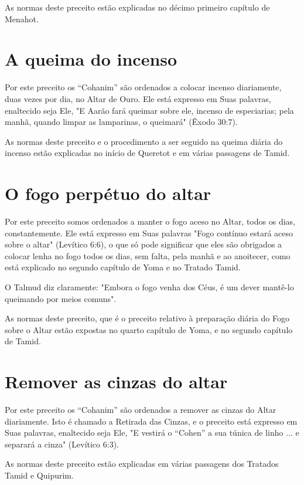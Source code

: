 As normas deste preceito estão explicadas no décimo primeiro capí­tulo
de Menahot.

\section{A queima do incenso}

Por este preceito os ``Cohanim'' são ordenados a colocar incenso
diariamente, duas vezes por dia, no Altar de Ouro. Ele está expresso em
Suas palavras, enaltecido seja Ele, "E Aarão fará queimar sobre ele,
incenso de espe­ciarias; pela manhã, quando limpar as lamparinas, o
queimará" (Êxodo 30:7).

As normas deste preceito e o procedimento a ser seguido na queima diária
do incenso estão explicadas no início de Queretot e em várias passagens
de Tamid.

\section{O fogo perpétuo do altar}

Por este preceito somos ordenados a manter o fogo aceso no Altar, todos
os dias, constantemente. Ele está expresso em Suas palavras "Fogo
con­tínuo estará aceso sobre o altar" (Levítico 6:6), o que só pode
significar que eles são obrigados a colocar lenha no fogo todos os dias,
sem falta, pela manhã e ao anoitecer, como está explicado no segundo
capítulo de Yoma e no Trata­do Tamid.

O Talmud diz claramente: "Embora o fogo venha dos Céus, é um dever
mantê-lo queimando por meios comuns".

As normas deste preceito, que é o preceito relativo à preparação diária
do Fogo sobre o Altar estão expostas no quarto capítulo de Yoma, e no
segun­do capítulo de Tamid.

\section{Remover as cinzas do altar}

Por este preceito os ``Cohanim'' são ordenados a remover as cinzas do
Altar diariamente. Isto é chamado a Retirada das Cinzas, e o preceito
está expresso em Suas palavras, enaltecido seja Ele, "E vestirá o
``Cohen'' a sua tú­nica de linho ... e separará a cinza" (Levítico 6:3).

As normas deste preceito estão explicadas em várias passagens dos
Tratados Tamid e Quipurim.


